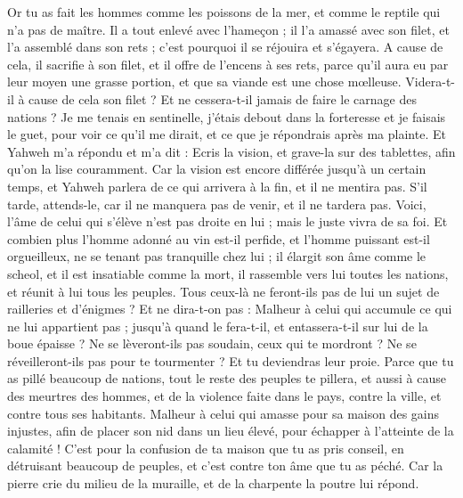 \begin{multicols}{2}
Or tu as fait les hommes comme les poissons de la mer, et comme le reptile qui n'a pas de maître.
Il a tout enlevé avec l'hameçon ; il l'a amassé avec son filet, et l'a assemblé dans son rets ; c'est pourquoi il se réjouira et s'égayera.
A cause de cela, il sacrifie à son filet, et il offre de l'encens à ses rets, parce qu'il aura eu par leur moyen une grasse portion, et que sa viande est une chose mœlleuse.
Videra-t-il à cause de cela son filet ? Et ne cessera-t-il jamais de faire le carnage des nations ?
\VerseOne{}Je me tenais en sentinelle, j'étais debout dans la forteresse et je faisais le guet, pour voir ce qu'il me dirait, et ce que je répondrais après ma plainte.
Et Yahweh m'a répondu et m'a dit : Ecris la vision, et grave-la sur des tablettes, afin qu'on la lise couramment.
Car la vision est encore différée jusqu'à un certain temps, et Yahweh parlera de ce qui arrivera à la fin, et il ne mentira pas. S'il tarde, attends-le, car il ne manquera pas de venir, et il ne tardera pas.
Voici, l'âme de celui qui s'élève n'est pas droite en lui ; mais le juste vivra de sa foi.
Et combien plus l'homme adonné au vin est-il perfide, et l'homme puissant est-il orgueilleux, ne se tenant pas tranquille chez lui ; il élargit son âme comme le scheol, et il est insatiable comme la mort, il rassemble vers lui toutes les nations, et réunit à lui tous les peuples.
Tous ceux-là ne feront-ils pas de lui un sujet de railleries et d'énigmes ? Et ne dira-t-on pas : Malheur à celui qui accumule ce qui ne lui appartient pas ; jusqu'à quand le fera-t-il, et entassera-t-il sur lui de la boue épaisse ?
Ne se lèveront-ils pas soudain, ceux qui te mordront ? Ne se réveilleront-ils pas pour te tourmenter ? Et tu deviendras leur proie.
Parce que tu as pillé beaucoup de nations, tout le reste des peuples te pillera, et aussi à cause des meurtres des hommes, et de la violence faite dans le pays, contre la ville, et contre tous ses habitants.
Malheur à celui qui amasse pour sa maison des gains injustes, afin de placer son nid dans un lieu élevé, pour échapper à l'atteinte de la calamité !
C'est pour la confusion de ta maison que tu as pris conseil, en détruisant beaucoup de peuples, et c'est contre ton âme que tu as péché.
Car la pierre crie du milieu de la muraille, et de la charpente la poutre lui répond.

\end{multicols}
